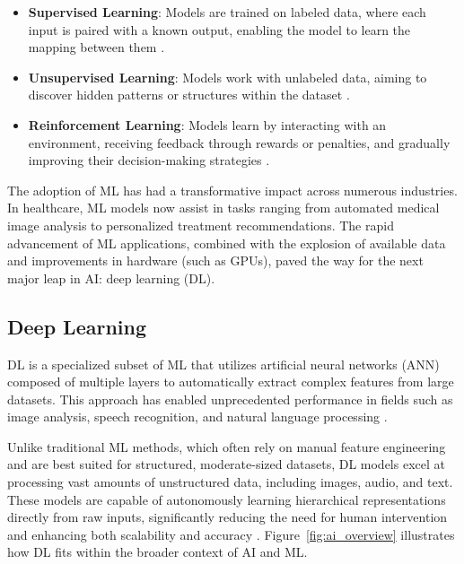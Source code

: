 \documentclass[a4paper,10pt]{book}
\begin{document}
\begin{itemize}
\item \textbf{Supervised Learning}: Models are trained on labeled data, where each input is paired with a known output, enabling the model to learn the mapping between them \cite{jiang_supervised_2020}.
\item \textbf{Unsupervised Learning}: Models work with unlabeled data, aiming to discover hidden patterns or structures within the dataset \cite{noauthor_unsupervised_nodate}.
\item \textbf{Reinforcement Learning}: Models learn by interacting with an environment, receiving feedback through rewards or penalties, and gradually improving their decision-making strategies \cite{ghasemi_introduction_2024}.
\end{itemize}



The adoption of ML has had a transformative impact across numerous industries. In healthcare, ML models now assist in tasks ranging from automated medical image analysis to personalized treatment recommendations. The rapid advancement of ML applications, combined with the explosion of available data and improvements in hardware (such as GPUs), paved the way for the next major leap in AI: deep learning (DL).


\subsection{Deep Learning}

DL is a specialized subset of ML that utilizes artificial neural networks (ANN) composed of multiple layers to automatically extract complex features from large datasets. This approach has enabled unprecedented performance in fields such as image analysis, speech recognition, and natural language processing  \cite{holdsworthWhatDeepLearning2024}.

Unlike traditional ML methods, which often rely on manual feature engineering and are best suited for structured, moderate-sized datasets, DL models excel at processing vast amounts of unstructured data, including images, audio, and text. These models are capable of autonomously learning hierarchical representations directly from raw inputs, significantly reducing the need for human intervention and enhancing both scalability and accuracy \cite{holdsworthWhatDeepLearning2024}. Figure~\ref{fig:ai_overview} illustrates how DL fits within the broader context of AI and ML.
\end{document}
